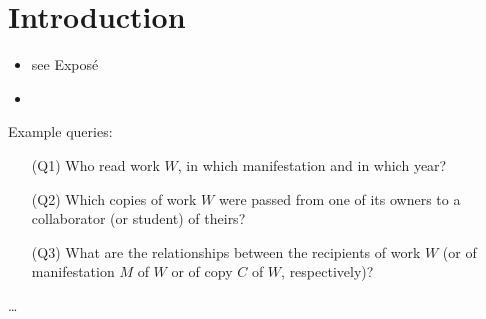 
\chapter{Introduction}
\label{chap:intro}

\begin{itemize}
  \item
    see Exposé
  \item
\end{itemize}

Example queries:
%
\begin{enumerate}
  \item[(Q1)]
    \label{exa_query1}
    Who read work $W$, in which manifestation and in which year?
  \item[(Q2)]
    \label{exa_query2}
    Which copies of work $W$ were passed from one of its owners to a collaborator (or student) of theirs?
  \item[(Q3)]
    \label{exa_query3}
    What are the relationships between the recipients of work $W$
    (or of manifestation $M$ of $W$ or of copy $C$ of $W$, respectively)?
\end{enumerate}


\dots

